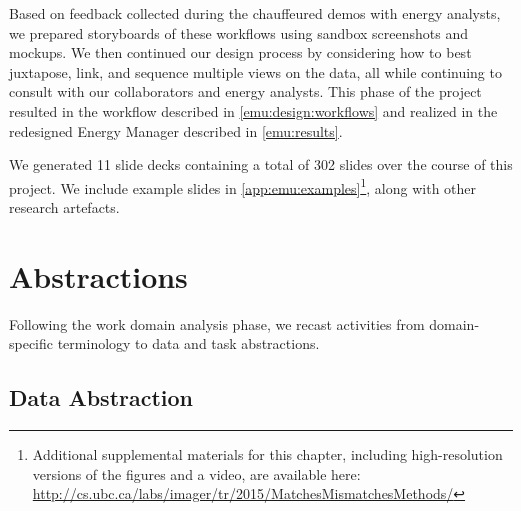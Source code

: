 Based on feedback collected during the chauffeured demos with energy analysts, we prepared storyboards of these workflows using sandbox screenshots and mockups. 
We then continued our design process by considering how to best juxtapose, link, and sequence multiple views on the data, all while continuing to consult with our collaborators and energy analysts.
This phase of the project resulted in the workflow described in \autoref{emu:design:workflows} and realized in the redesigned Energy Manager described in \autoref{emu:results}.

We generated 11 slide decks containing a total of 302 slides over the course of this project. 
We include example slides in \autoref{app:emu:examples}\footnote{Additional supplemental materials for this chapter, including high-resolution versions of the figures and a video, are available here: \url{http://cs.ubc.ca/labs/imager/tr/2015/MatchesMismatchesMethods/}}, along with other research artefacts.


\section{Abstractions}
\label{emu:abstractions}


Following the work domain analysis phase, we recast activities from domain-specific terminology to data and task abstractions.


\subsection{Data Abstraction}
\label{emu:data-abstractions}


